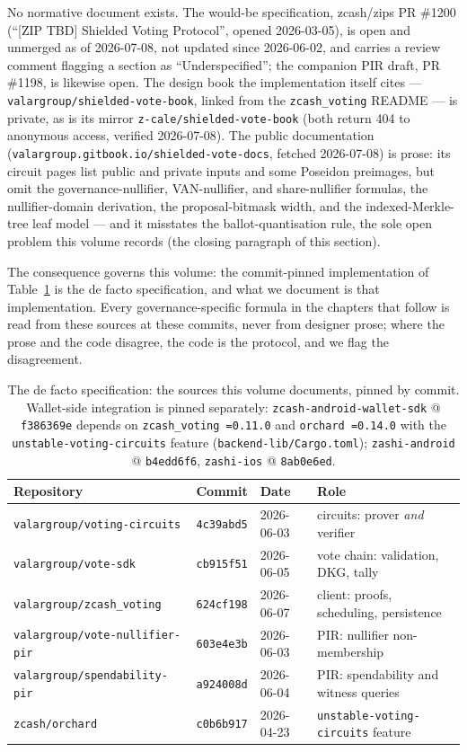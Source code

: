\documentclass[11pt,a4paper]{article}
\theoremstyle{definition}
\begin{document}
No normative document exists. The would-be specification, zcash/zips PR
\#1200 (``[ZIP TBD] Shielded Voting Protocol'', opened 2026-03-05), is open
and unmerged as of 2026-07-08, not updated since 2026-06-02, and carries a
review comment flagging a section as ``Underspecified''; the companion PIR
draft, PR \#1198, is likewise open. The design
book the implementation itself cites --- \texttt{valargroup/shielded-vote-book},
linked from the \texttt{zcash\_voting} README --- is private, as is its
mirror \texttt{z-cale/shielded-vote-book} (both return 404 to anonymous
access, verified 2026-07-08). The public documentation
(\texttt{valargroup.gitbook.io/shielded-vote-docs}, fetched 2026-07-08) is
prose: its circuit pages list public and private inputs and some Poseidon
preimages, but omit the governance-nullifier, VAN-nullifier, and
share-nullifier formulas, the nullifier-domain derivation, the
proposal-bitmask width, and the indexed-Merkle-tree leaf model --- and it
misstates the ballot-quantisation rule, the sole open problem this volume
records (the closing paragraph of this section).

The consequence governs this volume: the commit-pinned implementation of
Table~\ref{tab:vote-sources} is the de facto specification, and what we
document is that implementation. Every governance-specific formula in the
chapters that follow is read from these sources at these commits, never from
designer prose; where the prose and the code disagree, the code is the
protocol, and we flag the disagreement.

\begin{table}[htbp]
\centering
\small
\begin{tabular}{@{}llll@{}}
\toprule
Repository & Commit & Date & Role \\
\midrule
\texttt{valargroup/voting-circuits} & \texttt{4c39abd5} & 2026-06-03 &
  circuits: prover \emph{and} verifier \\
\texttt{valargroup/vote-sdk} & \texttt{cb915f51} & 2026-06-05 &
  vote chain: validation, DKG, tally \\
\texttt{valargroup/zcash\_voting} & \texttt{624cf198} & 2026-06-07 &
  client: proofs, scheduling, persistence \\
\texttt{valargroup/vote-nullifier-pir} & \texttt{603e4e3b} & 2026-06-03 &
  PIR: nullifier non-membership \\
\texttt{valargroup/spendability-pir} & \texttt{a924008d} & 2026-06-04 &
  PIR: spendability and witness queries \\
\texttt{zcash/orchard} & \texttt{c0b6b917} & 2026-04-23 &
  \texttt{unstable-voting-circuits} feature \\
\bottomrule
\end{tabular}
\caption{The de facto specification: the sources this volume documents,
pinned by commit. Wallet-side integration is pinned separately:
\texttt{zcash-android-wallet-sdk} @ \texttt{f386369e} depends on
\texttt{zcash\_voting~=0.11.0} and \texttt{orchard~=0.14.0} with the
\texttt{unstable-voting-circuits} feature
(\texttt{backend-lib/Cargo.toml}); \texttt{zashi-android} @
\texttt{b4edd6f6}, \texttt{zashi-ios} @ \texttt{8ab0e6ed}.}
\label{tab:vote-sources}
\end{table}
\end{document}
